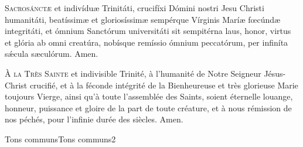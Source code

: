 \documentclass[nocturnal_bvm_fr.tex]{subfiles}
\begin{document}

\vspace{\baselineskip}


\pagebreak




\begin{paracol}{2}
\lettrine{S}{acrosánctæ} et indivíduæ Trinitáti, crucifíxi Dómini nostri Jesu Christi humanitáti, beatíssimæ et gloriosíssimæ sempérque Vírginis Maríæ fœcúndæ integritáti, et ómnium Sanctórum universitáti sit sempitérna laus, honor, virtus et glória ab omni creatúra, nobísque remíssio ómnium peccatórum, per infiníta sǽcula sæculórum. Amen.

\switchcolumn
\vspace{-1mm}
\lettrine{À}{ la Très Sainte} et indivisible Trinité, 
à l'humanité de Notre Seigneur Jésus-Christ crucifié, 
et à la féconde intégrité de la Bienheureuse et très glorieuse Marie toujours Vierge, 
ainsi qu'à toute l'assemblée des Saints, soient éternelle louange, honneur, puissance et gloire 
de la part de toute créature, et à nous rémission de nos péchés, pour l'infinie durée des siècles. Amen.

\end{paracol}

\vfill

	{Tons communs}{Tons communs}{2}{}{}{}{}{}{}

\vfill

\pagebreak
\end{document}
